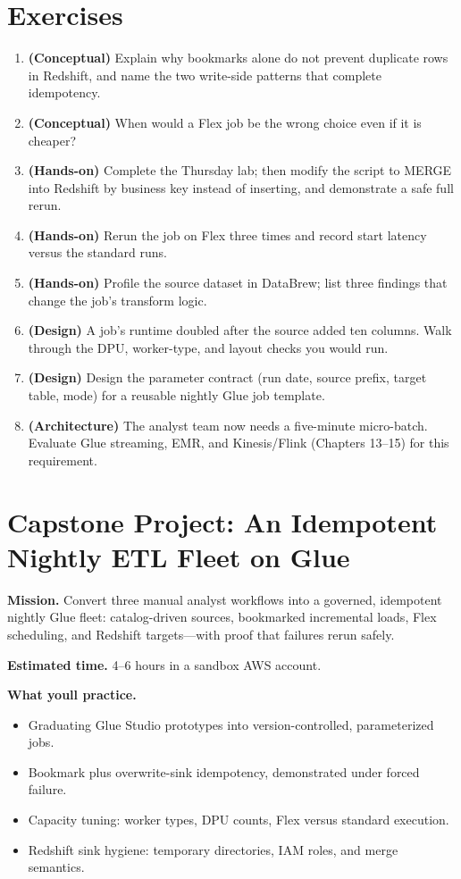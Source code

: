 \section{Exercises}
\begin{enumerate}
    \item \textbf{(Conceptual)} Explain why bookmarks alone do not prevent duplicate rows in Redshift, and name the two write-side patterns that complete idempotency.
    \item \textbf{(Conceptual)} When would a Flex job be the wrong choice even if it is cheaper?
    \item \textbf{(Hands-on)} Complete the Thursday lab; then modify the script to MERGE into Redshift by business key instead of inserting, and demonstrate a safe full rerun.
    \item \textbf{(Hands-on)} Rerun the job on Flex three times and record start latency versus the standard runs.
    \item \textbf{(Hands-on)} Profile the source dataset in DataBrew; list three findings that change the job's transform logic.
    \item \textbf{(Design)} A job's runtime doubled after the source added ten columns. Walk through the DPU, worker-type, and layout checks you would run.
    \item \textbf{(Design)} Design the parameter contract (run date, source prefix, target table, mode) for a reusable nightly Glue job template.
    \item \textbf{(Architecture)} The analyst team now needs a five-minute micro-batch. Evaluate Glue streaming, EMR, and Kinesis/Flink (Chapters 13--15) for this requirement.
\end{enumerate}

\section{Capstone Project: An Idempotent Nightly ETL Fleet on Glue}\label{sec:ch10-capstone}

\begin{capstonebox}
\textbf{Mission.} Convert three manual analyst workflows into a governed, idempotent nightly Glue fleet: catalog-driven sources, bookmarked incremental loads, Flex scheduling, and Redshift targets---with proof that failures rerun safely.

\textbf{Estimated time.} 4--6 hours in a sandbox AWS account.

\textbf{What you\textquotesingle{}ll practice.}
\begin{itemize}
    \item Graduating Glue Studio prototypes into version-controlled, parameterized jobs.
    \item Bookmark plus overwrite-sink idempotency, demonstrated under forced failure.
    \item Capacity tuning: worker types, DPU counts, Flex versus standard execution.
    \item Redshift sink hygiene: temporary directories, IAM roles, and merge semantics.
\end{itemize}
\end{capstonebox}

